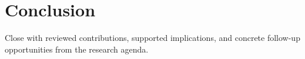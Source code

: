 \section{Conclusion}

Close with reviewed contributions, supported implications, and concrete
follow-up opportunities from the research agenda.
